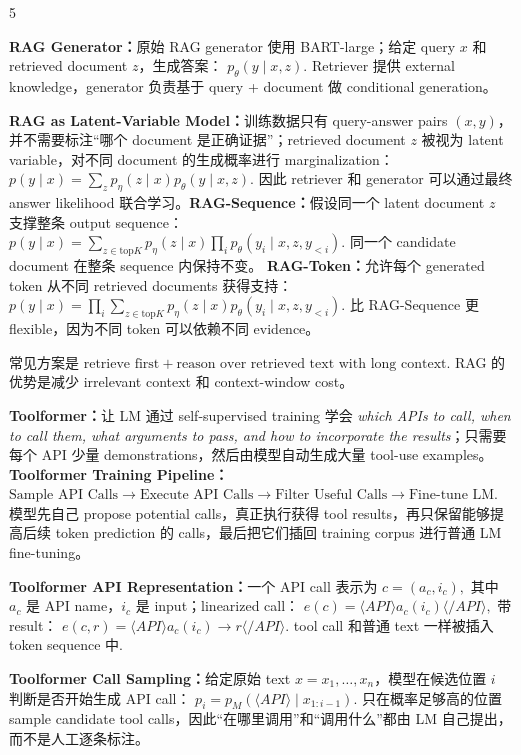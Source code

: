\documentclass[a4paper, landscape]{article}
\begin{document}
\begin{multicols}{5}
\par \textbf{RAG Generator：}原始 RAG generator 使用 BART-large；给定 query \(x\) 和 retrieved document \(z\)，生成答案：
\(
p_\theta(y\mid x,z).
\)
Retriever 提供 external knowledge，generator 负责基于 query + document 做 conditional generation。

\par \textbf{RAG as Latent-Variable Model：}训练数据只有 query-answer pairs \((x,y)\)，并不需要标注“哪个 document 是正确证据”；retrieved document \(z\) 被视为 latent variable，对不同 document 的生成概率进行 marginalization：
\(
p(y\mid x)=\sum_z p_\eta(z\mid x)p_\theta(y\mid x,z).
\)
因此 retriever 和 generator 可以通过最终 answer likelihood 联合学习。\textbf{RAG-Sequence：}假设同一个 latent document \(z\) 支撑整条 output sequence：
\(
p(y\mid x)=
\sum_{z\in \mathrm{top}K}
p_\eta(z\mid x)
\prod_i p_\theta(y_i\mid x,z,y_{<i}).
\)
同一个 candidate document 在整条 sequence 内保持不变。
\textbf{RAG-Token：}允许每个 generated token 从不同 retrieved documents 获得支持：
\(
p(y\mid x)=
\prod_i
\sum_{z\in \mathrm{top}K}
p_\eta(z\mid x)
p_\theta(y_i\mid x,z,y_{<i}).
\)
比 RAG-Sequence 更 flexible，因为不同 token 可以依赖不同 evidence。

常见方案是
\(
\text{retrieve first}+\text{reason over retrieved text with long context}.
\)
RAG 的优势是减少 irrelevant context 和 context-window cost。

\par \textbf{Toolformer：}让 LM 通过 self-supervised training 学会 \textit{which APIs to call, when to call them, what arguments to pass, and how to incorporate the results}；只需要每个 API 少量 demonstrations，然后由模型自动生成大量 tool-use examples。
\textbf{Toolformer Training Pipeline：}
\(
\text{Sample API Calls}
\rightarrow
\text{Execute API Calls}
\rightarrow
\text{Filter Useful Calls}
\rightarrow
\text{Fine-tune LM}.
\)
模型先自己 propose potential calls，真正执行获得 tool results，再只保留能够提高后续 token prediction 的 calls，最后把它们插回 training corpus 进行普通 LM fine-tuning。

\par \textbf{Toolformer API Representation：}一个 API call 表示为
\(
c=(a_c,i_c),
\)
其中 \(a_c\) 是 API name，\(i_c\) 是 input；linearized call：
\(
e(c)=\langle API\rangle a_c(i_c)\langle/API\rangle,
\)
带 result：
\(
e(c,r)=\langle API\rangle a_c(i_c)\rightarrow r\langle/API\rangle.
\)
tool call 和普通 text 一样被插入 token sequence 中.

\par \textbf{Toolformer Call Sampling：}给定原始 text \(x=x_1,\ldots,x_n\)，模型在候选位置 \(i\) 判断是否开始生成 API call：
\(
p_i=p_M(\langle API\rangle\mid x_{1:i-1}).
\)
只在概率足够高的位置 sample candidate tool calls，因此“在哪里调用”和“调用什么”都由 LM 自己提出，而不是人工逐条标注。


\end{multicols}
\end{document}
